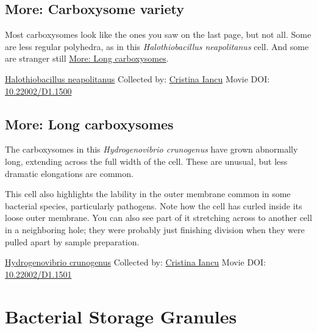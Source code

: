 \documentclass[]{tufte-book}
\begin{document}
\hypertarget{Carboxysome_variety}{%
\subsection*{More: Carboxysome variety}\label{Carboxysome_variety}}

Most carboxysomes look like the ones you saw on the last page, but not all. Some are less regular polyhedra, as in this \emph{Halothiobacillus neapolitanus} cell. And some are stranger still \protect\hyperlink{Long_carboxysomes}{More: Long carboxysomes}.



\hypertarget{htmlwidget-deab24e4ba14311ebe9e}{}

\label{fig:4-7a}\protect\hyperlink{tree}{Halothiobacillus neapolitanus} Collected by: \protect\hyperlink{cristina_iancu}{Cristina Iancu} Movie DOI: \href{https://doi.org/10.22002/D1.1500}{10.22002/D1.1500}

\hypertarget{Long_carboxysomes}{%
\subsection*{More: Long carboxysomes}\label{Long_carboxysomes}}

The carboxysomes in this \emph{Hydrogenovibrio crunogenus} have grown abnormally long, extending across the full width of the cell. These are unusual, but less dramatic elongations are common.

This cell also highlights the lability in the outer membrane common in some bacterial species, particularly pathogens. Note how the cell has curled inside its loose outer membrane. You can also see part of it stretching across to another cell in a neighboring hole; they were probably just finishing division when they were pulled apart by sample preparation.



\hypertarget{htmlwidget-705627e56e83c1189fe0}{}

\label{fig:4-7b}\protect\hyperlink{tree}{Hydrogenovibrio crunogenus} Collected by: \protect\hyperlink{cristina_iancu}{Cristina Iancu} Movie DOI: \href{https://doi.org/10.22002/D1.1501}{10.22002/D1.1501}

\hypertarget{bacterial-storage-granules}{%
\section{Bacterial Storage Granules}\label{bacterial-storage-granules}}
\end{document}
